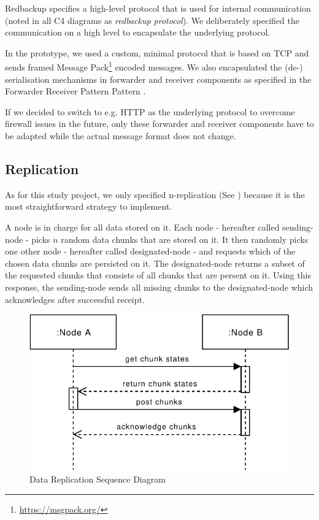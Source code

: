 Redbackup specifies a high-level protocol that is used for internal communication (noted in all C4 diagrams as \emph{redbackup protocol}). We deliberately specified the communication on a high level to encapsulate the underlying protocol.

In the prototype, we used a custom, minimal protocol that is based on TCP and sends framed Message Pack\footnote{\url{https://msgpack.org/}} encoded messages. We also encapsulated the (de-) serialisation mechanisms in forwarder and receiver components as specified in the Forwarder Receiver Pattern Pattern \cite{POSA1}.

If we decided to switch to e.g. HTTP as the underlying protocol to overcome firewall issues in the future, only these forwarder and receiver components have to be adapted while the actual message format does not change. 

\subsection{Replication}

As for this study project, we only specified n-replication (See ) because it is the most straightforward strategy to implement.

A \gls{node} is in charge for all data stored on it. Each \gls{node} - hereafter called \gls{sending-node} -  picks $n$ random data \glspl{chunk} that are stored on it. It then randomly picks one other \gls{node} - hereafter called \gls{designated-node} - and requests which of the chosen data \glspl{chunk} are persisted on it. The \gls{designated-node} returns a subset of the requested \glspl{chunk} that consists of all \glspl{chunk} that are persent on it. Using this response, the \gls{sending-node} sends all missing \glspl{chunk} to the \gls{designated-node} which acknowledges after successful receipt.

\begin{figure}[h]
    \centering
    \includegraphics[width=0.6\linewidth]{resources/data_replication.pdf}
    \caption{Data Replication Sequence Diagram}
\end{figure}

